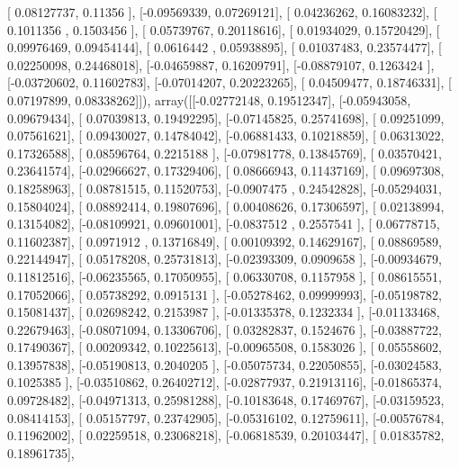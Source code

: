 \documentclass{article}
\begin{document}
       [ 0.08127737,  0.11356   ],
       [-0.09569339,  0.07269121],
       [ 0.04236262,  0.16083232],
       [ 0.1011356 ,  0.1503456 ],
       [ 0.05739767,  0.20118616],
       [ 0.01934029,  0.15720429],
       [ 0.09976469,  0.09454144],
       [ 0.0616442 ,  0.05938895],
       [ 0.01037483,  0.23574477],
       [ 0.02250098,  0.24468018],
       [-0.04659887,  0.16209791],
       [-0.08879107,  0.1263424 ],
       [-0.03720602,  0.11602783],
       [-0.07014207,  0.20223265],
       [ 0.04509477,  0.18746331],
       [ 0.07197899,  0.08338262]]), array([[-0.02772148,  0.19512347],
       [-0.05943058,  0.09679434],
       [ 0.07039813,  0.19492295],
       [-0.07145825,  0.25741698],
       [ 0.09251099,  0.07561621],
       [ 0.09430027,  0.14784042],
       [-0.06881433,  0.10218859],
       [ 0.06313022,  0.17326588],
       [ 0.08596764,  0.2215188 ],
       [-0.07981778,  0.13845769],
       [ 0.03570421,  0.23641574],
       [-0.02966627,  0.17329406],
       [ 0.08666943,  0.11437169],
       [ 0.09697308,  0.18258963],
       [ 0.08781515,  0.11520753],
       [-0.0907475 ,  0.24542828],
       [-0.05294031,  0.15804024],
       [ 0.08892414,  0.19807696],
       [ 0.00408626,  0.17306597],
       [ 0.02138994,  0.13154082],
       [-0.08109921,  0.09601001],
       [-0.0837512 ,  0.2557541 ],
       [ 0.06778715,  0.11602387],
       [ 0.0971912 ,  0.13716849],
       [ 0.00109392,  0.14629167],
       [ 0.08869589,  0.22144947],
       [ 0.05178208,  0.25731813],
       [-0.02393309,  0.0909658 ],
       [-0.00934679,  0.11812516],
       [-0.06235565,  0.17050955],
       [ 0.06330708,  0.1157958 ],
       [ 0.08615551,  0.17052066],
       [ 0.05738292,  0.0915131 ],
       [-0.05278462,  0.09999993],
       [-0.05198782,  0.15081437],
       [ 0.02698242,  0.2153987 ],
       [-0.01335378,  0.1232334 ],
       [-0.01133468,  0.22679463],
       [-0.08071094,  0.13306706],
       [ 0.03282837,  0.1524676 ],
       [-0.03887722,  0.17490367],
       [ 0.00209342,  0.10225613],
       [-0.00965508,  0.1583026 ],
       [ 0.05558602,  0.13957838],
       [-0.05190813,  0.2040205 ],
       [-0.05075734,  0.22050855],
       [-0.03024583,  0.1025385 ],
       [-0.03510862,  0.26402712],
       [-0.02877937,  0.21913116],
       [-0.01865374,  0.09728482],
       [-0.04971313,  0.25981288],
       [-0.10183648,  0.17469767],
       [-0.03159523,  0.08414153],
       [ 0.05157797,  0.23742905],
       [-0.05316102,  0.12759611],
       [-0.00576784,  0.11962002],
       [ 0.02259518,  0.23068218],
       [-0.06818539,  0.20103447],
       [ 0.01835782,  0.18961735],
\end{document}
